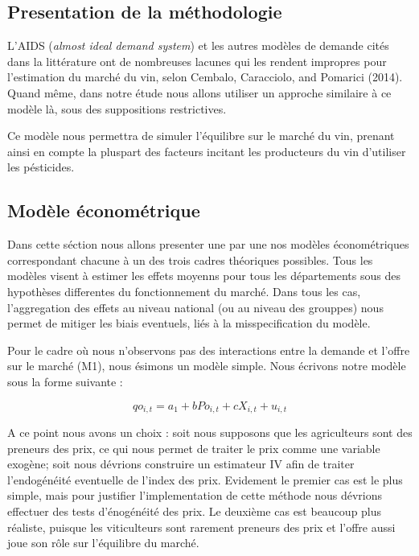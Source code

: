 \documentclass[11pt,]{article}
\begin{document}
\hypertarget{presentation-de-la-methodologie}{%
\subsection{Presentation de la
méthodologie}\label{presentation-de-la-methodologie}}

L'AIDS (\emph{almost ideal demand system}) et les autres modèles de
demande cités dans la littérature ont de nombreuses lacunes qui les
rendent impropres pour l'estimation du marché du vin, selon Cembalo,
Caracciolo, and Pomarici (2014). Quand même, dans notre étude nous
allons utiliser un approche similaire à ce modèle là, sous des
suppositions restrictives.

Ce modèle nous permettra de simuler l'équilibre sur le marché du vin,
prenant ainsi en compte la pluspart des facteurs incitant les
producteurs du vin d'utiliser les pésticides.

\hypertarget{modele-econometrique}{%
\subsection{Modèle économétrique}\label{modele-econometrique}}

Dans cette séction nous allons presenter une par une nos modèles
économétriques correspondant chacune à un des trois cadres théoriques
possibles. Tous les modèles visent à estimer les effets moyenns pour
tous les départements sous des hypothèses differentes du fonctionnement
du marché. Dans tous les cas, l'aggregation des effets au niveau
national (ou au niveau des grouppes) nous permet de mitiger les biais
eventuels, liés à la misspecification du modèle.

Pour le cadre où nous n'observons pas des interactions entre la demande
et l'offre sur le marché (M1), nous ésimons un modèle simple. Nous
écrivons notre modèle sous la forme suivante :

\begin{equation*}
  qo_{i,t} = a_1 + b Po_{i,t} + c X_{i,t} + u_{i,t}
\end{equation*}

A ce point nous avons un choix : soit nous supposons que les
agriculteurs sont des preneurs des prix, ce qui nous permet de traiter
le prix comme une variable exogène; soit nous dévrions construire un
estimateur IV afin de traiter l'endogénéité eventuelle de l'index des
prix. Evidement le premier cas est le plus simple, mais pour justifier
l'implementation de cette méthode nous dévrions effectuer des tests
d'énogénéité des prix. Le deuxième cas est beaucoup plus réaliste,
puisque les viticulteurs sont rarement preneurs des prix et l'offre
aussi joue son rôle sur l'équilibre du marché.
\end{document}
